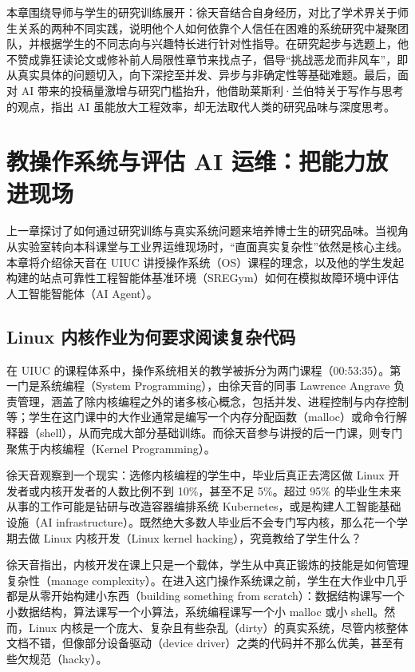 \documentclass[UTF8,a4paper,11pt,fontset=fandol]{ctexart}
\begin{document}
本章围绕导师与学生的研究训练展开：徐天音结合自身经历，对比了学术界关于师生关系的两种不同实践，说明他个人如何依靠个人信任在困难的系统研究中凝聚团队，并根据学生的不同志向与兴趣特长进行针对性指导。在研究起步与选题上，他不赞成靠狂读论文或修补前人局限性章节来找点子，倡导“挑战恶龙而非风车”，即从真实具体的问题切入，向下深挖至并发、异步与非确定性等基础难题。最后，面对 AI 带来的投稿量激增与研究门槛抬升，他借助莱斯利·兰伯特关于写作与思考的观点，指出 AI 虽能放大工程效率，却无法取代人类的研究品味与深度思考。
\section{教操作系统与评估 AI 运维：把能力放进现场}
上一章探讨了如何通过研究训练与真实系统问题来培养博士生的研究品味。当视角从实验室转向本科课堂与工业界运维现场时，“直面真实复杂性”依然是核心主线。本章将介绍徐天音在 UIUC 讲授操作系统（OS）课程的理念，以及他的学生发起构建的站点可靠性工程智能体基准环境（SREGym）如何在模拟故障环境中评估人工智能智能体（AI Agent）。
\subsection{Linux 内核作业为何要求阅读复杂代码}
在 UIUC 的课程体系中，操作系统相关的教学被拆分为两门课程（00:53:35）。第一门是系统编程（System Programming），由徐天音的同事 Lawrence Angrave 负责管理，涵盖了除内核编程之外的诸多核心概念，包括并发、进程控制与内存控制等；学生在这门课中的大作业通常是编写一个内存分配函数（malloc）或命令行解释器（shell），从而完成大部分基础训练。而徐天音参与讲授的后一门课，则专门聚焦于内核编程（Kernel Programming）。

徐天音观察到一个现实：选修内核编程的学生中，毕业后真正去湾区做 Linux 开发者或内核开发者的人数比例不到 10\%，甚至不足 5\%。超过 95\% 的毕业生未来从事的工作可能是钻研与改造容器编排系统 Kubernetes，或是构建人工智能基础设施（AI infrastructure）。既然绝大多数人毕业后不会专门写内核，那么花一个学期去做 Linux 内核开发（Linux kernel hacking），究竟教给了学生什么？

徐天音指出，内核开发在课上只是一个载体，学生从中真正锻炼的技能是如何管理复杂性（manage complexity）。在进入这门操作系统课之前，学生在大作业中几乎都是从零开始构建小东西（building something from scratch）：数据结构课写一个小数据结构，算法课写一个小算法，系统编程课写一个小 malloc 或小 shell。然而，Linux 内核是一个庞大、复杂且有些杂乱（dirty）的真实系统，尽管内核整体文档不错，但像部分设备驱动（device driver）之类的代码并不那么优美，甚至有些欠规范（hacky）。
\end{document}
